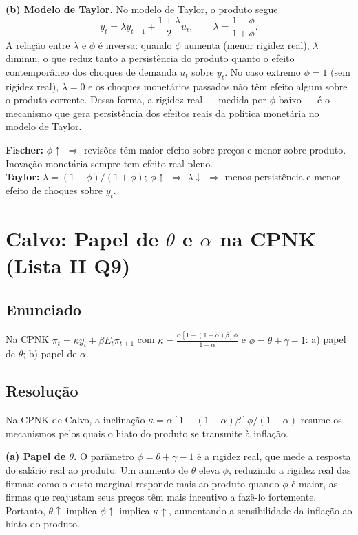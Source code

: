 \documentclass[12pt, a4paper]{article}
\begin{document}
\textbf{(b) Modelo de Taylor.} No modelo de Taylor, o produto segue
\[
y_t = \lambda y_{t-1} + \frac{1+\lambda}{2}u_t, \qquad \lambda = \frac{1-\phi}{1+\phi}.
\]
A relação entre $\lambda$ e $\phi$ é inversa: quando $\phi$ aumenta (menor rigidez real), $\lambda$ diminui, o que reduz tanto a persistência do produto quanto o efeito contemporâneo dos choques de demanda $u_t$ sobre $y_t$. No caso extremo $\phi = 1$ (sem rigidez real), $\lambda = 0$ e os choques monetários passados não têm efeito algum sobre o produto corrente. Dessa forma, a rigidez real --- medida por $\phi$ baixo --- é o mecanismo que gera persistência dos efeitos reais da política monetária no modelo de Taylor.

\begin{resultbox}[title={Fischer vs.\ Taylor: Papel de $\phi$ (Lista II Q8)}]
\textbf{Fischer:} $\phi\uparrow$ $\Rightarrow$ revisões têm maior efeito sobre preços e menor sobre produto. Inovação monetária sempre tem efeito real pleno.\\
\textbf{Taylor:} $\lambda = (1-\phi)/(1+\phi)$; $\phi\uparrow$ $\Rightarrow$ $\lambda\downarrow$ $\Rightarrow$ menos persistência e menor efeito de choques sobre $y_t$.
\end{resultbox}

\section{Calvo: Papel de $\theta$ e $\alpha$ na CPNK (Lista II Q9)}

\subsection*{Enunciado}
Na CPNK $\pi_t = \kappa y_t + \beta E_t\pi_{t+1}$ com $\kappa = \frac{\alpha[1-(1-\alpha)\beta]\phi}{1-\alpha}$ e $\phi = \theta+\gamma-1$: a) papel de $\theta$; b) papel de $\alpha$.

\subsection*{Resolução}

Na CPNK de Calvo, a inclinação $\kappa = \alpha[1-(1-\alpha)\beta]\phi/(1-\alpha)$ resume os mecanismos pelos quais o hiato do produto se transmite à inflação.

\textbf{(a) Papel de $\theta$.} O parâmetro $\phi = \theta + \gamma - 1$ é a rigidez real, que mede a resposta do salário real ao produto. Um aumento de $\theta$ eleva $\phi$, reduzindo a rigidez real das firmas: como o custo marginal responde mais ao produto quando $\phi$ é maior, as firmas que reajustam seus preços têm mais incentivo a fazê-lo fortemente. Portanto, $\theta\uparrow$ implica $\phi\uparrow$ implica $\kappa\uparrow$, aumentando a sensibilidade da inflação ao hiato do produto.
\end{document}
